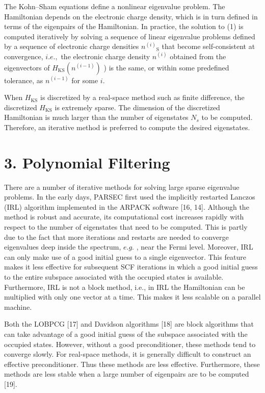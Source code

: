 \documentclass[
  10
]{article}
\begin{document}
The Kohn--Sham equations define a nonlinear eigenvalue problem. The
Hamiltonian depends on the electronic charge density, which is in turn
defined in terms of the eigenpairs of the Hamiltonian. In practice, the
solution to (1) is computed iteratively by solving a sequence of linear
eigenvalue problems defined by a sequence of electronic charge densities
\(n ^ { ( i ) } \mathrm { { _ S } }\) that become self-consistent at
convergence, \(i . e . ,\) the electronic charge density
\(n ^ { ( i ) }\) obtained from the eigenvectors of
\(H _ { \mathrm { K S } } ( n ^ { ( i - 1 ) } )\) ) is the same, or
within some predefined tolerance, as \(n ^ { ( i - 1 ) }\) for some
\(i .\)

When \(H _ { \mathrm { K S } }\) is discretized by a real-space method
such as finite difference, the discretized \(H _ { \mathrm { K S } }\)
is extremely sparse. The dimension of the discretized Hamiltonian is
much larger than the number of eigenstates \(N _ { s }\) to be computed.
Therefore, an iterative method is preferred to compute the desired
eigenstates.

\section{3. Polynomial Filtering}\label{polynomial-filtering}

There are a number of iterative methods for solving large sparse
eigenvalue problems. In the early days, PARSEC first used the implicitly
restarted Lanczos (IRL) algorithm implemented in the ARPACK software
{[}16, 14{]}. Although the method is robust and accurate, its
computational cost increases rapidly with respect to the number of
eigenstates that need to be computed. This is partly due to the fact
that more iterations and restarts are needed to converge eigenvalues
deep inside the spectrum, \(e . g .\) , near the Fermi level. Moreover,
IRL can only make use of a good initial guess to a single eigenvector.
This feature makes it less effective for subsequent SCF iterations in
which a good initial guess to the entire subspace associated with the
occupied states is available. Furthermore, IRL is not a block method,
i.e., in IRL the Hamiltonian can be multiplied with only one vector at a
time. This makes it less scalable on a parallel machine.

Both the LOBPCG {[}17{]} and Davidson algorithms {[}18{]} are block
algorithms that can take advantage of a good initial guess of the
subspace associated with the occupied states. However, without a good
preconditioner, these methods tend to converge slowly. For real-space
methods, it is generally difficult to construct an effective
preconditioner. Thus these methods are less effective. Furthermore,
these methods are less stable when a large number of eigenpairs are to
be computed {[}19{]}.
\end{document}
